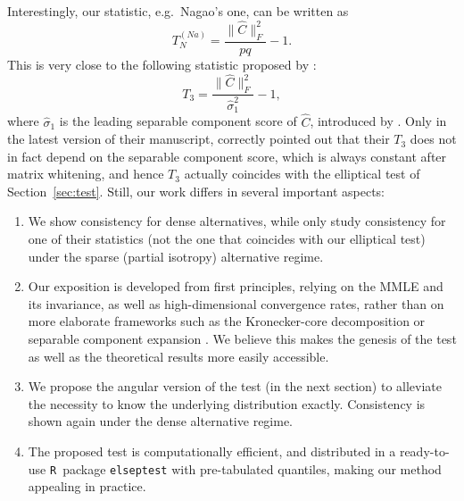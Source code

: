 \documentclass[12pt]{article}
\begin{document}
Interestingly, our statistic, e.g.~Nagao's one, can be written as
\[
T_N^{(Na)} = \frac{\|\widehat{C}\|_F^2}{pq} - 1.
\]
This is very close to the following statistic proposed by \citet{sung2026testing}:
\[
T_3 = \frac{\|\widehat{C}\|_F^2}{\widehat{\sigma}_1^2} - 1,
\]
where $\widehat\sigma_1$ is the leading separable component score of $\widehat{C}$, introduced by \citet{masak2023separable}. Only in the latest version of their manuscript, \citet{sung2026testing} correctly pointed out that their $T_3$ does not in fact depend on the separable component score, which is always constant after matrix whitening, and hence $T_3$ actually coincides with the elliptical test of Section~\ref{sec:test}. Still, our work differs in several important aspects:
\begin{enumerate}
    \item We show consistency for dense alternatives, while \citet{sung2026testing} only study consistency for one of their statistics (not the one that coincides with our elliptical test) under the sparse (partial isotropy) alternative regime.
    \item Our exposition is developed from first principles, relying on the MMLE and its invariance, as well as high-dimensional convergence rates, rather than on more elaborate frameworks such as the Kronecker-core decomposition \citep{hoff2023core} or separable component expansion \citep{masak2023separable}. We believe this makes the genesis of the test as well as the theoretical results more easily accessible.
    \item We propose the angular version of the test (in the next section) to alleviate the necessity to know the underlying distribution exactly. Consistency is shown again under the dense alternative regime.
    \item The proposed test is computationally efficient, and distributed in a ready-to-use \texttt{R}~package \texttt{elseptest} with pre-tabulated quantiles, making our method appealing in practice.
\end{enumerate}
\end{document}
